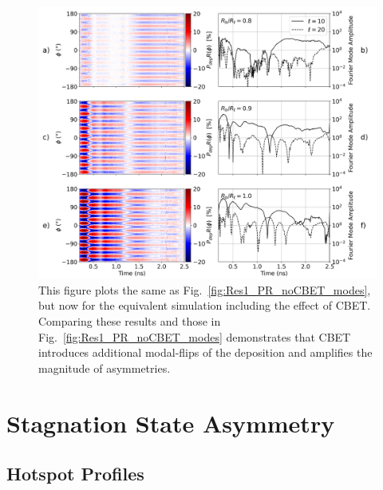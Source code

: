 \begin{figure}[t!]
    \includegraphics[width=\linewidth]{Results1/Images/CBET_PR_modes.png}
    \centering
    \caption{This figure plots the same as Fig.~\ref{fig:Res1_PR_noCBET_modes}, but now for the equivalent simulation including the effect of \ac{CBET}.
    Comparing these results and those in Fig.~\ref{fig:Res1_PR_noCBET_modes} demonstrates that \ac{CBET} introduces additional modal-flips of the deposition and amplifies the magnitude of asymmetries.}%
    \label{fig:Res1_PR_CBET_modes}
\end{figure}


\section{Stagnation State Asymmetry}%
\label{sec:Res1_StagnationAsymm}


\subsection{Hotspot Profiles}%
\label{sec:Res1_HS_profiles}

